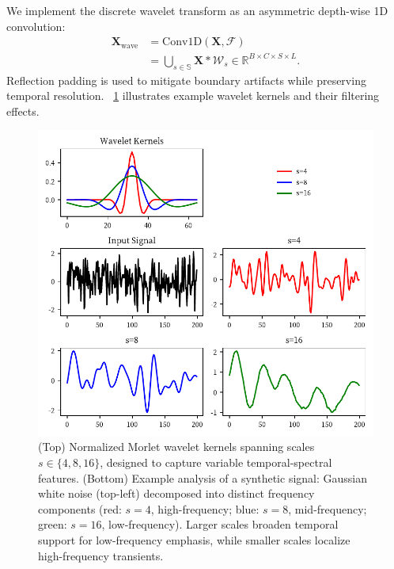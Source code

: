 \documentclass[conference]{IEEEtran}
\begin{document}
We implement the discrete wavelet transform as an asymmetric depth-wise 1D convolution:
\begin{equation}
    \begin{aligned}
        \mathbf{X}_{\text{wave}} & = \text{Conv1D}(\mathbf{X}, \mathcal{F})                                                            \\
                                 & = \bigcup_{s\in\mathbb{S}} \mathbf{X}\ast \mathcal{W}_s \in \mathbb{R}^{B\times C\times S\times L}.
    \end{aligned}
\end{equation}
Reflection padding is used to mitigate boundary artifacts while preserving temporal resolution. \figurename~\ref{fig:wavelet-transform} illustrates example wavelet kernels and their filtering effects.

\begin{figure}[htbp]
    \centering
    \includegraphics[width=0.9\linewidth]{wavelet-transform.pdf}
    \caption{(Top) Normalized Morlet wavelet kernels spanning scales \( s \in \{4, 8, 16\} \), designed to capture variable temporal-spectral features. (Bottom) Example analysis of a synthetic signal: Gaussian white noise (top-left) decomposed into distinct frequency components (red: \( s=4 \), high-frequency; blue: \( s=8 \), mid-frequency; green: \( s=16 \), low-frequency). Larger scales broaden temporal support for low-frequency emphasis, while smaller scales localize high-frequency transients.
    }

    \label{fig:wavelet-transform}
\end{figure}
\end{document}
